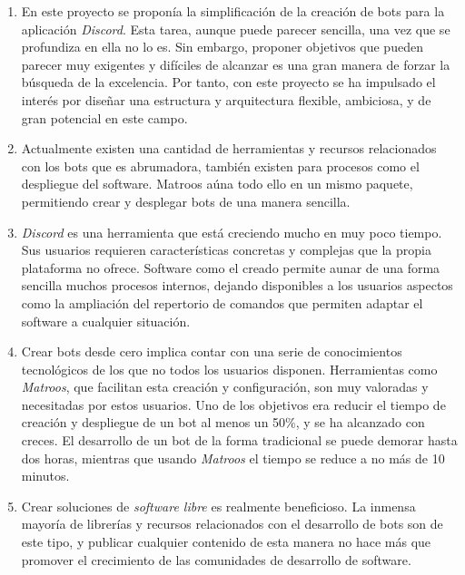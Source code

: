 \begin{enumerate}
	\item En este proyecto se proponía la simplificación de la creación de bots para la aplicación \textit{Discord}. Esta tarea, aunque puede parecer sencilla, una vez que se profundiza en ella no lo es. Sin embargo, proponer objetivos que pueden parecer muy exigentes y difíciles de alcanzar es una gran manera de forzar la búsqueda de la excelencia. Por tanto, con este proyecto se ha impulsado el interés por diseñar una estructura y arquitectura flexible, ambiciosa, y de gran potencial en este campo.
	
	\item Actualmente existen una cantidad de herramientas y recursos relacionados con los bots que es abrumadora, también existen para procesos como el despliegue del software. Matroos aúna todo ello en un mismo paquete, permitiendo crear y desplegar bots de una manera sencilla.

	\item \textit{Discord} es una herramienta que está creciendo mucho en muy poco tiempo. Sus usuarios requieren características concretas y complejas que la propia plataforma no ofrece. Software como el creado permite aunar de una forma sencilla muchos procesos internos, dejando disponibles a los usuarios aspectos como la ampliación del repertorio de comandos que permiten adaptar el software a cualquier situación.

	\item Crear bots desde cero implica contar con una serie de conocimientos tecnológicos de los que no todos los usuarios disponen. Herramientas como \textit{Matroos}, que facilitan esta creación y configuración, son muy valoradas y necesitadas por estos usuarios. Uno de los objetivos era reducir el tiempo de creación y despliegue de un bot al menos  un 50\%, y se ha alcanzado con creces. El desarrollo de un bot de la forma tradicional se puede demorar hasta dos horas, mientras que usando \textit{Matroos} el tiempo se reduce a no más de 10 minutos.

	\item Crear soluciones de \textit{software libre} es realmente beneficioso. La inmensa mayoría de librerías y recursos relacionados con el desarrollo de bots son de este tipo, y publicar cualquier contenido de esta manera no hace más que promover el crecimiento de las comunidades de desarrollo de software.
\end{enumerate}





